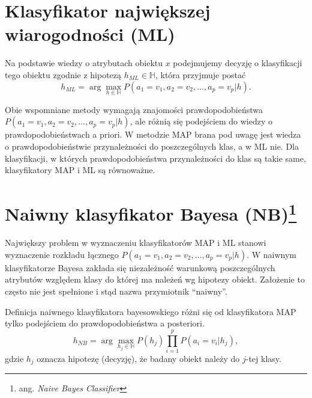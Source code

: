 \documentclass[
]{book}
\theoremstyle{plain}
\theoremstyle{definition}
\theoremstyle{definition}
\theoremstyle{definition}
\theoremstyle{definition}
\theoremstyle{remark}
\let\BeginKnitrBlock\begin \let\EndKnitrBlock\end
\begin{document}
\hypertarget{klasyfikator-najwiux119kszej-wiarogodnoux15bci-ml}{%
\section{Klasyfikator największej wiarogodności (ML)}\label{klasyfikator-najwiux119kszej-wiarogodnoux15bci-ml}}

Na podstawie wiedzy o atrybutach obiektu \(x\) podejmujemy decyzję o klasyfikacji tego obiektu zgodnie z hipotezą \(h_{ML}\in \mathbb{H}\), która przyjmuje postać
\begin{equation}\label{ML}
        h_{ML}=\operatorname{arg}\max_{h\in \mathbb{H}}P(a_1=v_1, a_2=v_2,\ldots,a_p=v_p|h).
\end{equation}

\BeginKnitrBlock{remark}
{}Obie wspomniane metody wymagają znajomości prawdopodobieństwa \(P(a_1=v_1,a_2=v_2,\ldots,a_p=v_p|h)\), ale różnią się podejściem do wiedzy o prawdopodobieństwach a priori. W metodzie MAP brana pod uwagę jest wiedza o prawdopodobieństwie przynależności do poszczególnych klas, a w ML nie. Dla klasyfikacji, w których prawdopodobieństwa przynależności do klas są takie same, klasyfikatory MAP i ML są równoważne.
\EndKnitrBlock{remark}

\hypertarget{naiwny-klasyfikator-bayesa-nb}{%
\section[Naiwny klasyfikator Bayesa (NB)]{\texorpdfstring{Naiwny klasyfikator Bayesa (NB)\footnote{ang. \emph{Naive Bayes Classifier}}}{Naiwny klasyfikator Bayesa (NB)}}\label{naiwny-klasyfikator-bayesa-nb}}

Największy problem w wyznaczeniu klasyfikatorów MAP i ML stanowi wyznaczenie rozkładu łącznego \(P(a_1=v_1, a_2=v_2,\ldots,a_p=v_p|h)\). W naiwnym klasyfikatorze Bayesa zakłada się niezależność warunkową poszczególnych atrybutów względem klasy do której ma należeń wg hipotezy obiekt. Założenie to często nie jest spełnione i stąd nazwa przymiotnik ``naiwny''.

Definicja naiwnego klasyfikatora bayesowskiego różni się od klasyfikatora MAP tylko podejściem do prawdopodobieństwa a posteriori.
\begin{equation}\label{naiwny_bayes}
        h_{NB}=\operatorname{arg}\max_{h_j\in \mathbb{H}}P(h_j)\prod_{i=1}^{p}P(a_i=v_i|h_j),
\end{equation}
gdzie \(h_j\) oznacza hipotezę (decyzję), że badany obiekt należy do \(j\)-tej klasy.
\end{document}
